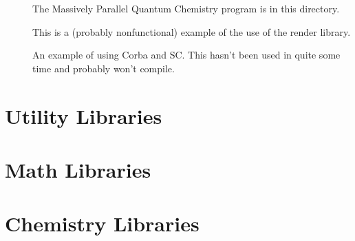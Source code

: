 \documentclass{report}
\begin{document}
\begin{description}
\item[]
  The Massively Parallel Quantum Chemistry program is in this directory.

\item[]
  This is a (probably nonfunctional) example of the use of the render
  library.

\item[]
  An example of using Corba and SC.  This hasn't been used in quite
  some time and probably won't compile.

\end{description}

\part{Utility Libraries}








\part{Math Libraries}





\part{Chemistry Libraries}



\printindex
\end{document}
